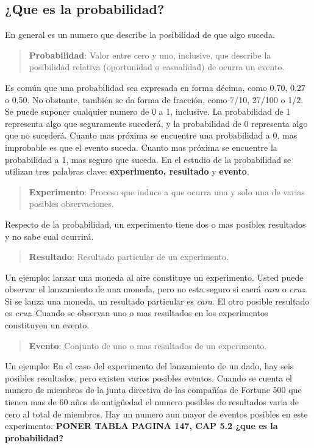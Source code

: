 \documentclass[]{article}
\begin{document}
\subsection{¿Que es la probabilidad?}
En general es un numero que describe la posibilidad de que algo suceda.
\begin{quote}
	\textbf{Probabilidad}: Valor entre cero y uno, inclusive, que describe la posibilidad relativa (oportunidad o casualidad) de ocurra un evento.
\end{quote}
Es común que una probabilidad sea expresada en forma décima, como 0.70, 0.27 o 0.50. No obstante, también se da forma de fracción, como 7/10, 27/100 o 1/2. Se puede suponer cualquier numero de 0 a 1, inclusive. La probabilidad de 1 representa algo que seguramente sucederá, y la probabilidad de 0 representa algo que no sucederá. Cuanto mas próxima se encuentre una probabilidad a 0, mas improbable es que el evento suceda. Cuanto mas próxima se encuentre la probabilidad a 1, mas seguro que suceda. En el estudio de la probabilidad se utilizan tres palabras clave: \textbf{experimento, resultado} y \textbf{evento}.
\begin{quote}
	\textbf{Experimento}: Proceso que induce a que ocurra una y solo una de varias posibles observaciones.
\end{quote}
Respecto de la probabilidad, un experimento tiene dos o mas posibles resultados y no sabe cual ocurrirá.
\begin{quote}
	\textbf{Resultado}: Resultado particular de un experimento.
\end{quote}
Un ejemplo: lanzar una moneda al aire constituye un experimento. Usted puede observar el lanzamiento de una moneda, pero no esta seguro si caerá \textit{cara} o \textit{cruz}. Si se lanza una moneda, un resultado particular es \textit{cara}. El otro posible resultado es \textit{cruz}. Cuando se observan uno o mas resultados en los experimentos constituyen un evento.
\begin{quote}
	\textbf{Evento}: Conjunto de uno o mas resultados de un experimento.
\end{quote}
Un ejemplo: En el caso del experimento del lanzamiento de un dado, hay seis posibles resultados, pero existen varios posibles eventos. Cuando se cuenta el numero de miembros de la junta directiva de las compañías de Fortune 500 que tienen mas de 60 años de antigüedad el numero posibles de resultados varia de cero al total de miembros. Hay un numero aun mayor de eventos posibles en este experimento.
\textbf{PONER TABLA PAGINA 147, CAP 5.2 ¿que es la probabilidad?}
\end{document}

